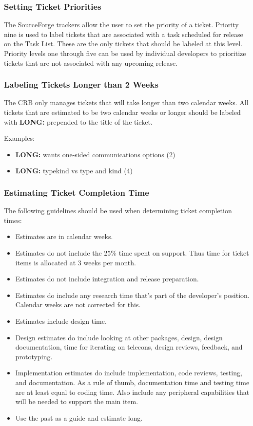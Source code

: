 \subsubsection{Setting Ticket Priorities}

The SourceForge trackers allow the user to set the priority of a ticket. Priority nine is used
to label tickets that are associated with a task scheduled for release on the Task List.
These are the only tickets that should be labeled at this level. Priority levels one through 
five can be used by individual developers to prioritize tickets that are not associated with 
any upcoming release.

\subsubsection{Labeling Tickets Longer than 2 Weeks}
\label{sec:longticket}
The CRB only manages tickets that will take longer than two calendar weeks.
All tickets that are estimated to be two calendar weeks or longer should
be labeled with {\bf LONG:} prepended to the title of the ticket. 

\vspace{2mm}
Examples:
\begin{itemize}
\item  {\bf LONG:} wants one-sided communications options (2) 
\item  {\bf LONG:} typekind vs type and kind (4)
\end{itemize}

\subsubsection{Estimating Ticket Completion Time}

The following guidelines should be used when determining ticket completion times:

\begin{itemize}
\item Estimates are in calendar weeks.
\item Estimates do not include the 25\% time spent on support.  Thus
time for ticket items is allocated at 3 weeks per month.
\item Estimates do not include integration and release preparation.
\item Estimates do include any research time that's part of the developer's position. Calendar weeks are not corrected for this.
\item Estimates include design time. 
\item Design estimates do include looking at other packages, design, design documentation, time for iterating on telecons, design reviews, feedback, and prototyping.
\item Implementation estimates do include implementation, code reviews, testing, and documentation. As a rule of thumb, documentation time and testing time are at least equal to coding time. Also include any peripheral capabilities that will be needed to support the main item.
\item Use the past as a guide and estimate long.
\end {itemize}

